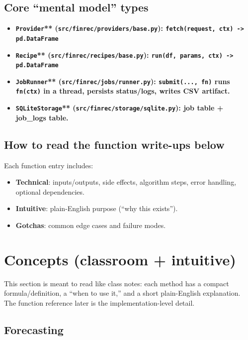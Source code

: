 \documentclass[11pt]{article}
\begin{document}
\subsection{Core “mental model” types}

\begin{itemize}[leftmargin=*,nosep]
\item \textbf{\texttt{Provider}** (\texttt{src/finrec/providers/base.py}): \texttt{fetch(request, ctx) -> pd.DataFrame}}
\item \textbf{\texttt{Recipe}** (\texttt{src/finrec/recipes/base.py}): \texttt{run(df, params, ctx) -> pd.DataFrame}}
\item \textbf{\texttt{JobRunner}** (\texttt{src/finrec/jobs/runner.py}): \texttt{submit(..., fn)} runs \texttt{fn(ctx)} in a thread, persists status/logs, writes CSV artifact.}
\item \textbf{\texttt{SQLiteStorage}** (\texttt{src/finrec/storage/sqlite.py}): job table + job\_logs table.}
\end{itemize}


\subsection{How to read the function write-ups below}

Each function entry includes:

\begin{itemize}[leftmargin=*,nosep]
\item \textbf{Technical}: inputs/outputs, side effects, algorithm steps, error handling, optional dependencies.
\item \textbf{Intuitive}: plain-English purpose (“why this exists”).
\item \textbf{Gotchas}: common edge cases and failure modes.
\end{itemize}


\vspace{0.25em}
\section{Concepts (classroom + intuitive)}

This section is meant to read like class notes: each method has a compact formula/definition, a “when to use it,” and a short plain-English explanation. The function reference later is the implementation-level detail.

\subsection{Forecasting}
\end{document}
